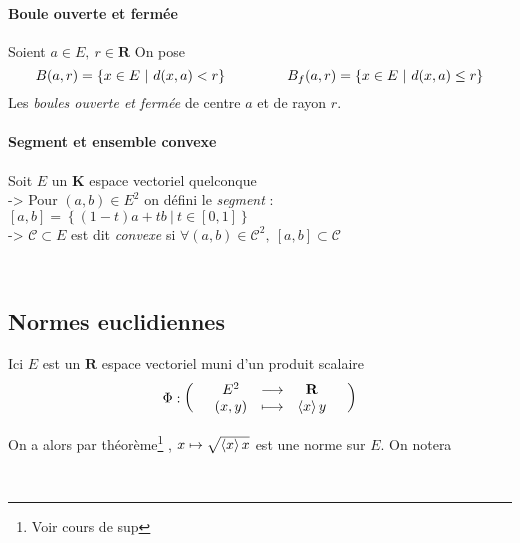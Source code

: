 			
		\traitd
		\paragraph{Boule ouverte et fermée} Soient $a\in E,~r\in\mathbf{R}$ On pose
			\[B(a,r) = \left\{ x\in E ~|~ d(x,a)<r\right\} \hspace*{1.5cm} B_f (a,r) = \left\{ x\in E ~|~ d(x,a) \leq r\right\}\]
			\hspace*{0.6cm} Les \emph{boules ouverte et fermée} de centre $a$ et de rayon $r$. 
		\traitdouble
		\paragraph{Segment et ensemble convexe} Soit $E$ un $\mathbf{K}$ espace vectoriel quelconque \vspace*{0.2cm}\\
			\hspace*{0.5cm} -> Pour $(a,b)\in E^2$ on défini le \emph{segment} : $[a,b]=\left\{ (1-t)a +tb ~\vert ~t\in [0,1]\right\}$ \\
			\hspace*{0.5cm} -> $\mathcal{C} \subset E$ est dit \emph{convexe} si $\forall (a,b)\in \mathcal{C}^2,~[a,b]\subset \mathcal{C}$
		\trait 
		
		 \\

	\subsection{Normes euclidiennes}
		Ici $E$ est un $\mathbf{R}$ espace vectoriel muni d'un produit scalaire\footnotemark[1] 
		\[
			\Phi :  \appli{E^2}{(x,y)}{\mathbf{R}}{\scal{x}{y}}
		\]
			
		
		On a alors par théorème\footnote[2]{Voir cours de sup} ,  $x\mapsto \sqrt{\scal{x}{x}}$ est une norme sur $E$.  
		On notera \begin{center}  \end{center} 
		
		 ~\\
			
